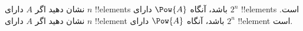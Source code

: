 {نشان دهید اگر $A$ دارای $n$ !!{element}s باشد، آنگاه $\Pow{A}$ دارای
$2^n$ !!{element}s است.}
{نشان دهید اگر $A$ دارای $n$ !!{element} باشد، آنگاه $\Pow{A}$ دارای
$2^n$ !!{element} است.}
